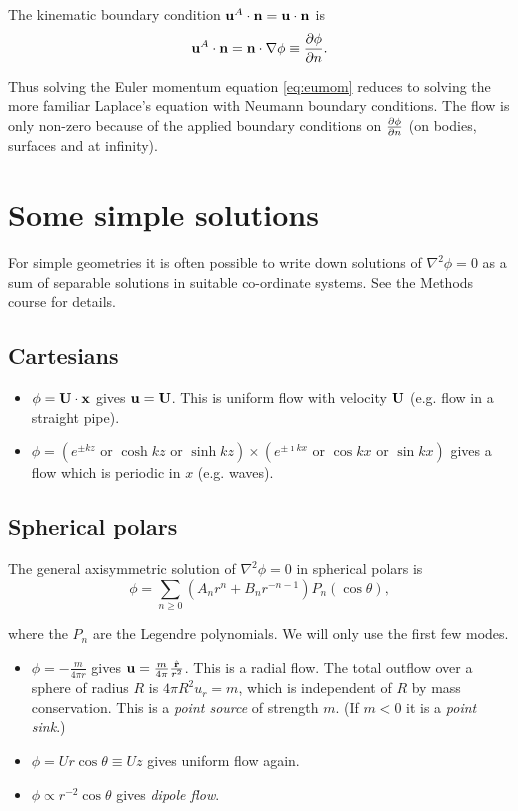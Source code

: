 \documentclass{notes}
\newcommand{\grad}{\nabla}
\newcommand{\lapl}{\nabla^2}
\begin{document}
The kinematic boundary condition $\mathbf{u}^A \cdot \mathbf{n} = \mathbf{u} \cdot \mathbf{n}$ is
\[
\vu^A\cdot\vn = \vn\cdot\grad\phi \equiv \pd{\phi}{n}.
\]

Thus solving the Euler momentum equation \eqref{eq:eumom} reduces to
solving the more familiar Laplace's equation with Neumann boundary
conditions.  The flow is only non-zero because of the applied boundary
conditions on $\frac{\partial \phi}{\partial n}$ (on bodies, surfaces and at infinity).

\section{Some simple solutions}

For simple geometries it is often possible to write down solutions of
$\lapl\phi = 0$ as a sum of separable solutions in suitable
co-ordinate systems.  See the Methods course for details.

\subsection*{Cartesians}

\begin{itemize}
\item $\phi = \mathbf{U}\cdot\mathbf{x}$ gives $\mathbf{u} = \mathbf{U}$.  This is uniform
  flow with velocity $\mathbf{U}$ (e.g. flow in a straight pipe).
\item $\phi = (e^{\pm k z} \text{ or } \cosh kz \text{ or } \sinh kz)
  \times (e^{\pm \imath k x} \text{ or } \cos kx \text{ or } \sin kx)$
  gives a flow which is periodic in $x$ (e.g. waves).
\end{itemize}

\subsection*{Spherical polars}

The general axisymmetric solution of $\lapl\phi=0$ in spherical polars
is
\[
\phi = \sum_{n \ge 0} \left( A_n r^n + B_n r^{-n-1} \right) P_n(\cos \theta),
\]

where the $P_n$ are the Legendre polynomials.  We will only use the
first few modes.

\begin{itemize}
\item $\phi = - \frac{m}{4 \pi r}$ gives $\mathbf{u} = \frac{m}{4 \pi}
  \frac{\Hat{\mathbf{r}}}{r^2}$.  This is a radial flow.  The total
  outflow over a sphere of radius $R$ is $4 \pi R^2 u_r = m$, which is
  independent of $R$ by mass conservation.  This is a \emph{point
    source} of strength $m$.  (If $m < 0$ it is a \emph{point sink}.)
\item $\phi = U r \cos \theta \equiv U z$ gives uniform flow again.
\item $\phi \propto r^{-2} \cos \theta$ gives \emph{dipole flow}.
\end{itemize}
\end{document}
